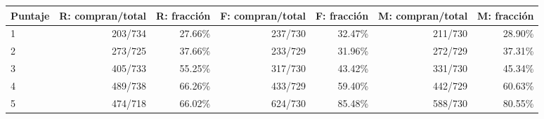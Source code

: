 \begin{center}\small\setlength{\tabcolsep}{4pt}
\begin{adjustbox}{max width=\textwidth}\begin{tabular}{lrrrrrr}
\toprule
Puntaje & R: compran/total & R: fracción & F: compran/total & F: fracción & M: compran/total & M: fracción \\ \midrule
1 & 203/734 & 27.66\% & 237/730 & 32.47\% & 211/730 & 28.90\% \\
2 & 273/725 & 37.66\% & 233/729 & 31.96\% & 272/729 & 37.31\% \\
3 & 405/733 & 55.25\% & 317/730 & 43.42\% & 331/730 & 45.34\% \\
4 & 489/738 & 66.26\% & 433/729 & 59.40\% & 442/729 & 60.63\% \\
5 & 474/718 & 66.02\% & 624/730 & 85.48\% & 588/730 & 80.55\% \\
\bottomrule\end{tabular}\end{adjustbox}\end{center}
